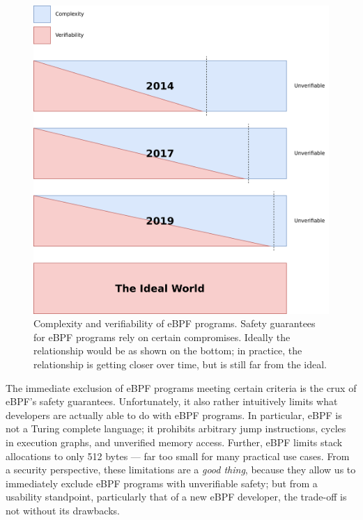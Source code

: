 \documentclass[
  12pt]{findlay}
\begin{document}
\begin{figure}[p]
    \caption[Complexity and verifiability of eBPF programs.]{
        Complexity and verifiability of eBPF programs.
        Safety guarantees for eBPF programs rely on certain compromises.
        Ideally the relationship would be as shown on the bottom;
        in practice, the relationship is getting closer over time, but is still
        far from the ideal.
    }
    \label{complexity-verifiability}
    \includegraphics[height=.4\textheight]{../figures/complexity-verifiability.png}
\end{figure}

The immediate exclusion of eBPF programs meeting certain criteria is the
crux of eBPF's safety guarantees. Unfortunately, it also rather
intuitively limits what developers are actually able to do with eBPF
programs. In particular, eBPF is not a Turing complete language; it
prohibits arbitrary jump instructions, cycles in execution graphs, and
unverified memory access. Further, eBPF limits stack allocations to only
512 bytes \autocite{gregg19bpf} --- far too small for many practical use
cases. From a security perspective, these limitations are a \emph{good
thing}, because they allow us to immediately exclude eBPF programs with
unverifiable safety; but from a usability standpoint, particularly that
of a new eBPF developer, the trade-off is not without its drawbacks.
\end{document}
